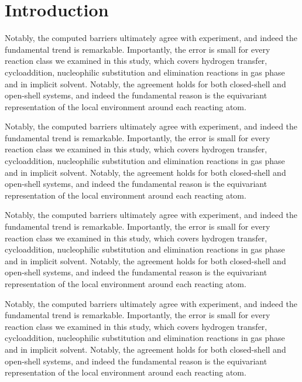 \documentclass{article}
\begin{document}
\begin{abstract}
We study barrier heights.
\end{abstract}
\section{Introduction}
Notably, the computed barriers ultimately agree with experiment, and indeed the fundamental trend is remarkable. Importantly, the error is small for every reaction class we examined in this study, which covers hydrogen transfer, cycloaddition, nucleophilic substitution and elimination reactions in gas phase and in implicit solvent. Notably, the agreement holds for both closed-shell and open-shell systems, and indeed the fundamental reason is the equivariant representation of the local environment around each reacting atom.

Notably, the computed barriers ultimately agree with experiment, and indeed the fundamental trend is remarkable. Importantly, the error is small for every reaction class we examined in this study, which covers hydrogen transfer, cycloaddition, nucleophilic substitution and elimination reactions in gas phase and in implicit solvent. Notably, the agreement holds for both closed-shell and open-shell systems, and indeed the fundamental reason is the equivariant representation of the local environment around each reacting atom.

Notably, the computed barriers ultimately agree with experiment, and indeed the fundamental trend is remarkable. Importantly, the error is small for every reaction class we examined in this study, which covers hydrogen transfer, cycloaddition, nucleophilic substitution and elimination reactions in gas phase and in implicit solvent. Notably, the agreement holds for both closed-shell and open-shell systems, and indeed the fundamental reason is the equivariant representation of the local environment around each reacting atom.

Notably, the computed barriers ultimately agree with experiment, and indeed the fundamental trend is remarkable. Importantly, the error is small for every reaction class we examined in this study, which covers hydrogen transfer, cycloaddition, nucleophilic substitution and elimination reactions in gas phase and in implicit solvent. Notably, the agreement holds for both closed-shell and open-shell systems, and indeed the fundamental reason is the equivariant representation of the local environment around each reacting atom.
\end{document}

